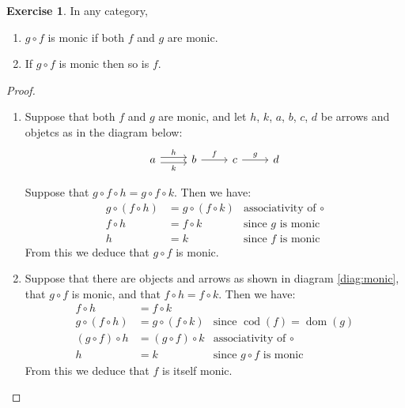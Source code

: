 \documentclass[10pt,a4paper,twoside]{article}
\DeclareMathOperator{\dom}{dom}
\DeclareMathOperator{\cod}{cod}
\theoremstyle{definition}
\newcounter{excounter}
\newtheorem{exercise}[excounter]{Exercise}
\begin{document}
\begin{exercise}

  In any category,
  \begin{enumerate}
  \item $g \circ f$ is monic if both $f$ and $g$ are monic.
  \item If $g \circ f$ is monic then so is $f$.
  \end{enumerate}

\end{exercise}

\begin{proof}

  \begin{enumerate}

  \item Suppose that both $f$ and $g$ are monic, and let $h$, $k$, $a$, $b$, $c$, $d$ be arrows and objetcs as in the diagram below:
    \begin{equation}\label{diag:monic}
      \begin{tikzcd}
        a \arrow[r, shift left, "h"] \arrow[r, shift right, "k" below]
        & b \arrow[r, "f"]
        & c \arrow[r, "g"]
        & d
      \end{tikzcd}
    \end{equation}

    Suppose that $g \circ f \circ h = g \circ f \circ k$. Then we have:
    \begin{align*}
      g \circ ( f \circ h ) &= g \circ ( f \circ k ) &\text{associativity of }\circ \\
                  f \circ h &= f \circ k             &\text{since $g$ is monic} \\
                          h &= k                     &\text{since $f$ is monic}
    \end{align*}
    From this we deduce that $g \circ f$ is monic.

  \item Suppose that there are objects and arrows as shown in diagram \ref{diag:monic}, that $g \circ f$ is monic, and that $f \circ h = f \circ k$. Then we have:
    \begin{align*}
      f \circ h             &= f \circ k \\
      g \circ ( f \circ h ) &= g \circ ( f \circ k ) &\text{since }\cod(f) = \dom(g) \\
      ( g \circ f ) \circ h &= ( g \circ f ) \circ k &\text{associativity of }\circ \\
                          h &= k                     &\text{since $g \circ f$ is monic}
    \end{align*}
    From this we deduce that $f$ is itself monic.

  \end{enumerate}

\end{proof}
\end{document}
